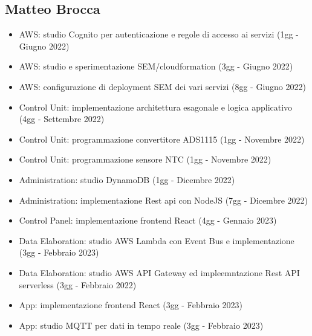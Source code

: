 \subsection{Matteo Brocca}
\begin{itemize}
    \item AWS: studio Cognito per autenticazione e regole di accesso ai servizi (1gg - Giugno 2022) 
    \item AWS: studio e sperimentazione SEM/cloudformation (3gg - Giugno 2022) 
    \item AWS: configurazione di deployment SEM dei vari servizi (8gg - Giugno 2022) 
    \item Control Unit: implementazione architettura esagonale e logica applicativo (4gg - Settembre 2022)
    \item Control Unit: programmazione convertitore ADS1115 (1gg - Novembre 2022)
    \item Control Unit: programmazione sensore NTC (1gg - Novembre 2022)
    \item Administration: studio DynamoDB (1gg - Dicembre 2022)
    \item Administration: implementazione Rest api con NodeJS (7gg - Dicembre 2022) 
    \item Control Panel: implementazione frontend React (4gg - Gennaio 2023) 
    \item Data Elaboration: studio AWS Lambda con Event Bus e implementazione (3gg - Febbraio 2023)
    \item Data Elaboration: studio AWS API Gateway ed impleemntazione Rest API serverless (3gg - Febbraio 2022)
    \item App: implementazione frontend React (3gg - Febbraio 2023) 
    \item App: studio MQTT per dati in tempo reale (3gg - Febbraio 2023) 
\end{itemize}
